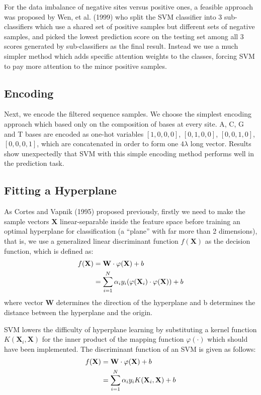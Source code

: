 \documentclass[journal,twoside]{IEEEtran}
\begin{document}
For the data imbalance of negative sites versus positive ones, a feasible approach was proposed by Wen, et al. (1999) \cite{fang1999splice} who split the SVM classifier into 3 sub-classifiers which use a shared set of positive samples but different sets of negative samples, and picked the lowest prediction score on the testing set among all 3 scores generated by sub-classifiers as the final result. Instead we use a much simpler method which adds specific attention weights to the classes, forcing SVM to pay more attention to the minor positive samples. 

\subsection{Encoding}\label{2.3}

Next, we encode the filtered sequence samples. We choose the simplest encoding approach which based only on the composition of bases at every site. A, C, G and T bases are encoded as one-hot variables $[1, 0, 0, 0]$, $[0, 1, 0, 0]$, $[0, 0, 1, 0]$, $[0, 0, 0, 1]$, which are concatenated in order to form one $4\lambda$ long vector. Results show unexpectedly that SVM with this simple encoding method performs well in the prediction task. 

\subsection{Fitting a Hyperplane}\label{2.4}

As Cortes and Vapnik (1995) \cite{cortes1995support} proposed previously, firstly we need to make the sample vectors $\textbf{X}$ linear-separable inside the feature space before training an optimal hyperplane for classification (a ``plane'' with far more than 2 dimensions), that is, we use a generalized linear discriminant function $f(\textbf{X})$ as the decision function, which is defined as: 
\begin{align}
f(\textbf{X}) & = \textbf{W} \cdot \varphi(\textbf{X}) + b \notag \\
& = \sum\limits_{i=1}^N \alpha_i y_i (\varphi(\textbf{X}_i) \cdot  \varphi(\textbf{X})) + b
\label{eq1}
\end{align}
where vector $\textbf{W}$ determines the direction of the hyperplane and b determines the distance between the hyperplane and the origin. 

SVM lowers the difficulty of hyperplane learning by substituting a kernel function $K(\textbf{X}_i, \textbf{X})$ for the inner product of the mapping function $\varphi(\cdot)$ which should have been implemented. The discriminant function of an SVM is given as follows: 
\begin{align}
f(\textbf{X}) & = \textbf{W} \cdot \varphi(\textbf{X}) + b \notag \\
& = \sum\limits_{i=1}^N \alpha_i y_i K(\textbf{X}_i, \textbf{X}) + b
\label{eq2}
\end{align}
\end{document}
